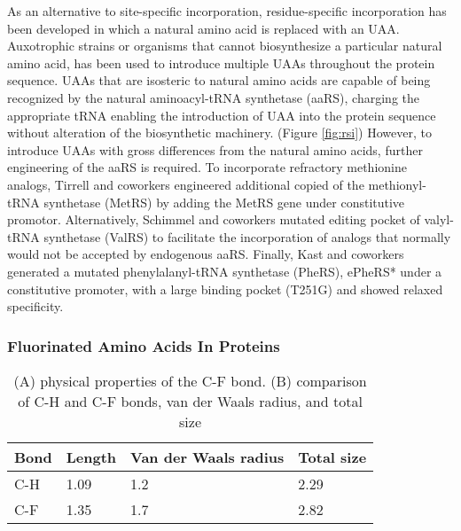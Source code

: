 \begin{refsection}
As an alternative to site-specific incorporation, residue-specific
incorporation has been developed in which a natural amino acid is replaced with
an UAA. Auxotrophic strains or organisms that cannot biosynthesize a particular
natural amino acid, has been used to introduce multiple UAAs throughout the
protein sequence. UAAs that are isosteric to natural amino acids are capable of
being recognized by the natural aminoacyl-tRNA synthetase (aaRS), charging the
appropriate tRNA enabling the introduction of UAA into the protein sequence
without alteration of the biosynthetic machinery. (Figure \ref{fig:rsi})
However, to introduce UAAs with gross differences from the natural amino acids,
further engineering of the aaRS is required. To incorporate refractory
methionine analogs, Tirrell and coworkers engineered additional copied of the
methionyl-tRNA synthetase (MetRS) by adding the MetRS gene under constitutive
promotor\cite{Kiick2000}.  Alternatively, Schimmel and coworkers mutated
editing pocket of valyl-tRNA synthetase (ValRS) to facilitate the incorporation
of analogs that normally would not be accepted by endogenous
aaRS\cite{Doring2001}. Finally, Kast and coworkers generated a mutated
phenylalanyl-tRNA synthetase (PheRS), ePheRS* under a constitutive promoter,
with a large binding pocket (T251G) and showed relaxed
specificity\cite{Kast1991}.

\subsubsection{Fluorinated Amino Acids In Proteins} 
\label{sec:faa-intro}

\begin{table}[h!]
\centering
\begin{tabular}{ llll }
  \hline
  Bond & Length & Van der Waals radius & Total size \\
  \hline

  C-H & 1.09 & 1.2 & 2.29 \\
  C-F & 1.35 & 1.7 & 2.82 \\

  \hline
\end{tabular}
\caption[(A) physical properties of the C-F bond. (B) comparison of C-H and C-F
bonds, van der Waals radius, and total size]{(A) physical properties of the C-F
bond. (B) comparison of C-H and C-F bonds, van der Waals radius, and total
size\cite{Tang2001,Odar2015}}
\label{tab:c-fbond}
\end{table}


\end{refsection}
